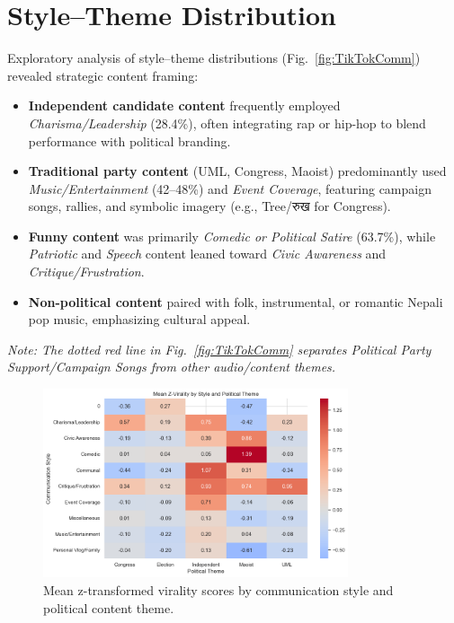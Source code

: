 \documentclass[12pt,a4paper]{report}
\begin{document}
\section*{Style--Theme Distribution}
Exploratory analysis of style--theme distributions (Fig.~\ref{fig:TikTokComm}) revealed strategic content framing:
\begin{itemize}[noitemsep]
    \item \textbf{Independent candidate content} frequently employed \emph{Charisma/Leadership} (28.4\%), often integrating rap or hip-hop to blend performance with political branding.
    \item \textbf{Traditional party content} (UML, Congress, Maoist) predominantly used \emph{Music/Entertainment} (42--48\%) and \emph{Event Coverage}, featuring campaign songs, rallies, and symbolic imagery (e.g., Tree/\texthindi{रुख} for Congress).
    \item \textbf{Funny content} was primarily \emph{Comedic or Political Satire} (63.7\%), while \emph{Patriotic} and \emph{Speech} content leaned toward \emph{Civic Awareness} and \emph{Critique/Frustration}.
    \item \textbf{Non-political content} paired with folk, instrumental, or romantic Nepali pop music, emphasizing cultural appeal.
\end{itemize}
\textit{Note: The dotted red line in Fig.~\ref{fig:TikTokComm} separates Political Party Support/Campaign Songs from other audio/content themes.}
\newpage
\begin{figure}[ht]
\centering
\includegraphics[width=0.8\textwidth]{figures/RQ2/mean_z_virality_v2.png}
\caption{Mean z-transformed virality scores by communication style and political content theme.}
\label{fig:Mean_Z_Virality}
\end{figure}
\end{document}
